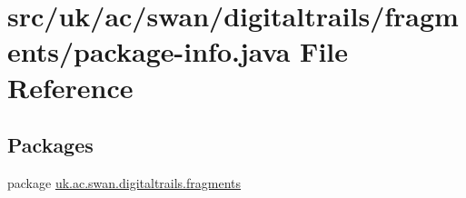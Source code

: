 \hypertarget{fragments_2package-info_8java}{\section{src/uk/ac/swan/digitaltrails/fragments/package-\/info.java File Reference}
\label{fragments_2package-info_8java}
}
\subsection*{Packages}
\begin{DoxyCompactItemize}
\item 
package \hyperlink{namespaceuk_1_1ac_1_1swan_1_1digitaltrails_1_1fragments}{uk.\+ac.\+swan.\+digitaltrails.\+fragments}
\end{DoxyCompactItemize}
